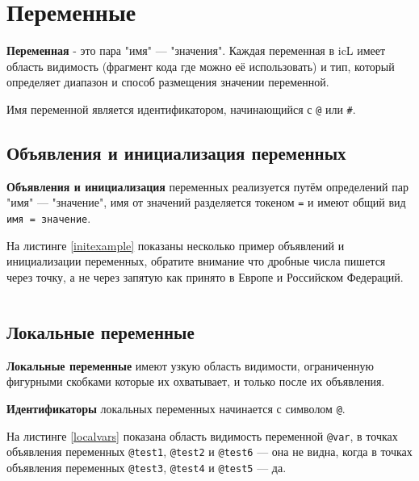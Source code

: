 \section{Переменные}

\textbf{Переменная} - это пара "имя" — "значения". Каждая переменная в icL имеет область видимость (фрагмент кода где можно её использовать) и тип, который определяет диапазон и способ размещения значении переменной.

Имя переменной является идентификатором, начинающийся с \texttt{@} или {\color{blue2}\texttt{#}}.

\subsection{Объявления и инициализация переменных}

\textbf{Объявления и инициализация} переменных реализуется путём определений пар "имя" — "значение", имя от значений разделяется токеном \texttt{=} и имеют общий вид \texttt{имя = значение}.

На листинге \ref{initexample} показаны несколько пример объявлений и инициализации переменных, обратите внимание что дробные числа пишется через точку, а не через запятую как принято в Европе и Российском Федераций.

\begin{sourcecode}
	\label{initexample}
    \inputminted[linenos]{icl}{../sources/initexample.icL}
\end{sourcecode}

\subsection{Локальные переменные}

\textbf{Локальные переменные} имеют узкую область видимости, ограниченную фигурными скобками которые их охватывает, и только после их объявления.

{\bf Идентификаторы} локальных переменных начинается с символом \texttt{@}.

На листинге \ref{localvars} показана область видимость переменной \texttt{@var}, в точках объявления переменных \texttt{@test1}, \texttt{@test2} и \texttt{@test6} — она не видна, когда в точках объявления переменных \texttt{@test3}, \texttt{@test4} и \texttt{@test5} — да.
\begin{sourcecode}
	\label{localvars}
    \inputminted[linenos]{icl}{../sources/localvars.icL}
\end{sourcecode}

